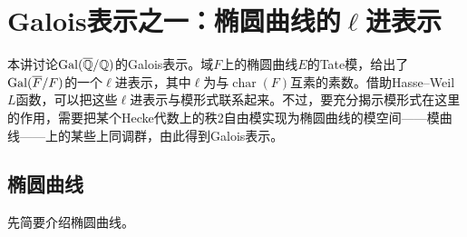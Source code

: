 \chapter{Galois表示之一：椭圆曲线的\texorpdfstring{$\ell$}{ℓ}进表示}\label{L7}
本讲讨论$\operatorname{Gal}(\overline{\mathbb{Q}}/\mathbb{Q})$的Galois表示。域$F$上的椭圆曲线$E$的Tate模，给出了$\operatorname{Gal}(\overline F/F)$的一个$\ell$进表示，其中$\ell$为与$\operatorname{char}(F)$互素的素数。借助Hasse--Weil $L$函数，可以把这些$\ell$进表示与模形式联系起来。不过，要充分揭示模形式在这里的作用，需要把某个Hecke代数上的秩2自由模实现为椭圆曲线的模空间——模曲线——上的某些上同调群，由此得到Galois表示。
\section{椭圆曲线}\label{L7S1}
先简要介绍椭圆曲线。

